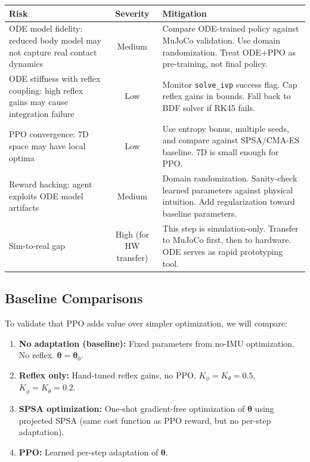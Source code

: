 \documentclass[11pt]{article}
\begin{document}
\begin{center}
\begin{tabular}{p{4.5cm}cp{5.5cm}}
\toprule
\textbf{Risk} & \textbf{Severity} & \textbf{Mitigation} \\
\midrule
ODE model fidelity: reduced body model may not capture real contact dynamics & Medium & Compare ODE-trained policy against MuJoCo validation. Use domain randomization. Treat ODE+PPO as pre-training, not final policy. \\
\addlinespace
ODE stiffness with reflex coupling: high reflex gains may cause integration failure & Low & Monitor \texttt{solve\_ivp} success flag. Cap reflex gains in bounds. Fall back to BDF solver if RK45 fails. \\
\addlinespace
PPO convergence: 7D space may have local optima & Low & Use entropy bonus, multiple seeds, and compare against SPSA/CMA-ES baseline. 7D is small enough for PPO. \\
\addlinespace
Reward hacking: agent exploits ODE model artifacts & Medium & Domain randomization. Sanity-check learned parameters against physical intuition. Add regularization toward baseline parameters. \\
\addlinespace
Sim-to-real gap & High (for HW transfer) & This step is simulation-only. Transfer to MuJoCo first, then to hardware. ODE serves as rapid prototyping tool. \\
\bottomrule
\end{tabular}
\end{center}

\subsection{Baseline Comparisons}

To validate that PPO adds value over simpler optimization, we will compare:

\begin{enumerate}
    \item \textbf{No adaptation (baseline):} Fixed parameters from no-IMU optimization. No reflex. $\boldsymbol{\theta} = \boldsymbol{\theta}_0$.
    \item \textbf{Reflex only:} Hand-tuned reflex gains, no PPO. $K_\phi = K_\theta = 0.5$, $K_{\dot\phi} = K_{\dot\theta} = 0.2$.
    \item \textbf{SPSA optimization:} One-shot gradient-free optimization of $\boldsymbol{\theta}$ using projected SPSA (same cost function as PPO reward, but no per-step adaptation).
    \item \textbf{PPO:} Learned per-step adaptation of $\boldsymbol{\theta}$.
\end{enumerate}
\end{document}
